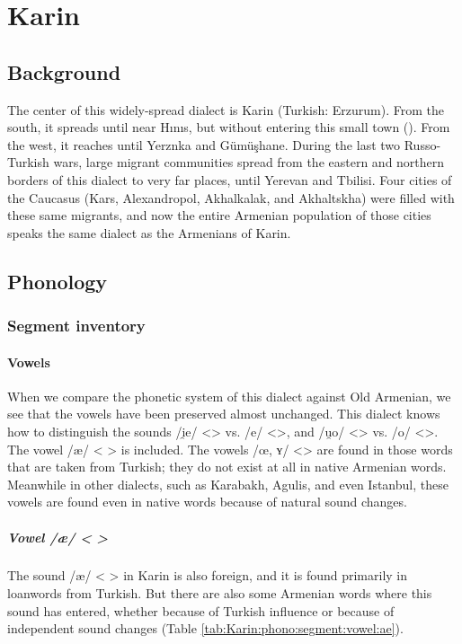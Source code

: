 \chapter{Karin}\label{chapter:Karin}
\section{Background}
\begin{adjarianpage}\label{page:104}\end{adjarianpage}%


The center of this widely-spread dialect is Karin (Turkish: Erzurum). From the south, it spreads until near Hınıs, but without entering this small town (). From the west, it reaches until Yerznka and Gümüşhane. During the last two Russo-Turkish wars, large migrant communities spread from the eastern and northern borders of this dialect to very far places, until Yerevan and Tbilisi. Four cities of the Caucasus (Kars, Alexandropol, Akhalkalak, and Akhaltskha) were filled with these same migrants, and now the entire Armenian population of those cities speaks the same dialect as the Armenians of Karin. 

\section{Phonology}

\subsection{Segment inventory}

\subsubsection{Vowels}
When we compare the phonetic system of this dialect against Old Armenian, we see that the vowels have been preserved almost unchanged. This dialect knows how to distinguish the sounds /i̯e/ <> vs. /e/ <>, and /u̯o/ <> vs. /o/ <>. The vowel /æ/ < > is included. The vowels /œ, ʏ/ <> are found in those words that are taken from Turkish; they do not exist at all in native Armenian words. Meanwhile in other dialects, such as Karabakh, Agulis, and even Istanbul, these vowels are found even in native words because of natural sound changes.

\paragraph{Vowel /æ/ < >}
The sound /æ/ < > in Karin is also foreign, and it is found primarily in loanwords from Turkish. But there are also some Armenian words where this sound has entered, whether because of Turkish influence or because of independent sound changes (Table \ref{tab:Karin:phono:segment:vowel:ae}).

